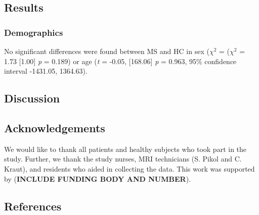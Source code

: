 \documentclass[11pt,]{article}
\begin{document}
\subsection{Results}\label{results}

\subsubsection{Demographics}\label{demographics}

No significant differences were found between MS and HC in sex
(\(\chi^2\) = (\(\chi^2\) = 1.73 {[}1.00{]} \emph{p} = 0.189) or age
(\emph{t} = -0.05, {[}168.06{]} \emph{p} = 0.963, 95\% confidence
interval -1431.05, 1364.63).

\subsection{Discussion}\label{discussion}

\subsection{Acknowledgements}\label{acknowledgements}

We would like to thank all patients and healthy subjects who took part
in the study. Further, we thank the study nurses, MRI technicians (S.
Pikol and C. Kraut), and residents who aided in collecting the data.
This work was supported by (\textbf{INCLUDE FUNDING BODY AND NUMBER}).

\subsection{References}\label{references}




\newpage
\singlespacing 

\end{document}
